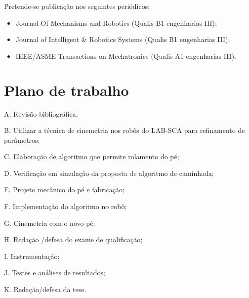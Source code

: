 Pretende-se publicação nos seguintes periódicos:
\begin{itemize}
\item Journal Of Mechanisms and Robotics (Qualis B1 engenharias III);

\item Journal of Intelligent \& Robotics Systems (Qualis B1 engenharias III);

\item IEEE/ASME Transactions on Mechatronics (Qualis A1 engenharias III).
 \end{itemize}

\section{Plano de trabalho}

A.	Revisão bibliográfica;

B.	Utilizar a técnica de cinemetria nos robôs do LAB-SCA para refinamento de parâmetros;

C.	Elaboração de algoritmo que permite rolamento do pé;

D.	Verificação em simulação da proposta de algoritmo de caminhada;

E.	Projeto mecânico do pé e fabricação;

F.	Implementação do algoritmo no robô;

G.	Cinemetria com o novo pé;

H.	Redação /defesa do exame de qualificação;

I.	Instrumentação;

J.	Testes e análises de resultados;

K.	Redação/defesa da tese.


